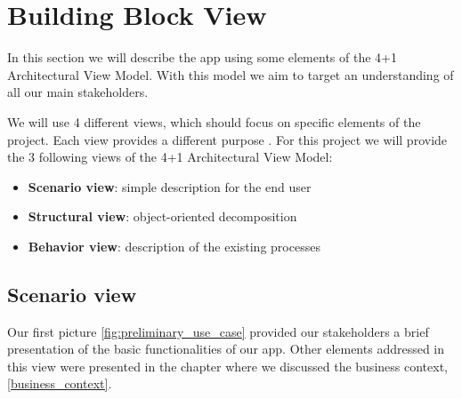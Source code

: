 \section{Building Block View}

In this section we will describe the \gls{app} using some elements of the 4+1 Architectural View Model. With this model we
aim to target an understanding of all our main stakeholders.

We will use 4 different views, which should focus on specific elements of the project. Each view provides a different
purpose \cite{refart:KR41}. For this project we will provide the 3 following views of the 4+1 Architectural View 
Model:

\begin{itemize}
    \item \textbf{Scenario view}: simple description for the end user 
    \item \textbf{Structural view}: object-oriented decomposition
    \item \textbf{Behavior view}: description of the existing processes
\end{itemize}

\subsection{Scenario view}

Our first picture \ref{fig:preliminary_use_case} provided our stakeholders a brief presentation of the basic functionalities of our app. Other elements addressed in this view were presented in the chapter where we discussed the business context, \ref{business_context}. 




